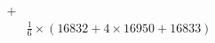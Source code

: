 \documentclass[preview]{standalone}
\begin{document}
\begin{align*}
+&\\&\frac{1}{6}\times(16832+4\times16950+16833)
\end{align*}
\end{document}
